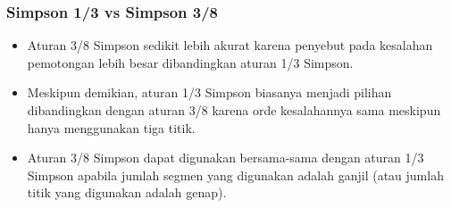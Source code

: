 \begin{frame}
\frametitle{Simpson 1/3 vs Simpson 3/8}

\begin{itemize}
\item Aturan 3/8 Simpson sedikit lebih akurat karena penyebut pada kesalahan pemotongan
lebih besar dibandingkan aturan 1/3 Simpson.
\item Meskipun demikian, aturan 1/3 Simpson biasanya menjadi pilihan dibandingkan dengan aturan
3/8 karena orde kesalahannya sama meskipun hanya menggunakan tiga titik.
\item Aturan 3/8 Simpson dapat digunakan bersama-sama dengan aturan 1/3 Simpson apabila
jumlah segmen yang digunakan adalah ganjil (atau jumlah titik yang digunakan adalah genap).
\end{itemize}


\end{frame}





